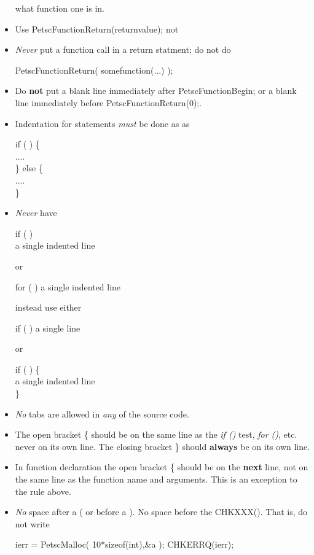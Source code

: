 \documentclass[twoside,12pt]{../sty/report_petsc}
\begin{document}
\begin{itemize}
what function one is in.
\item Use PetscFunctionReturn(returnvalue); not 
\item {\em Never} put a function call in a return statment; do not do
\begin{tabbing}
   PetscFunctionReturn( somefunction(...) );
\end{tabbing}
\item Do {\bf not} put a blank line immediately after PetscFunctionBegin; or 
a blank line immediately before PetscFunctionReturn(0);.
\item Indentation for  statements {\em must}  be done  as
as
\begin{tabbing}
   if (  ) \{\\
     ....\\
   \} else \{\\
     ....\\
   \}
\end{tabbing}
\item {\em Never}  have 
\begin{tabbing}
   if (  ) \\
     a single indented line
\end{tabbing}
or
\begin{tabbing}
   for (  )
     a single indented line
\end{tabbing}
instead use either 
\begin{tabbing}
   if (  ) a single line
\end{tabbing}
or 
\begin{tabbing}
   if (  ) \{\\
     a single indented line\\
   \}
\end{tabbing}
\item {\em No} tabs are allowed in {\em any} of the source code.
\item The open bracket \{ should be on the same line as the {\em if ()} test, {\em for ()}, etc. never on 
      its own line. The closing bracket \} should {\bf always} be on its own line. 
\item In function declaration the open bracket \{ should be on the {\bf next} line, not on the same line as the function name and
      arguments. This is an exception to the rule above.
\item {\em No} space after a ( or before a ). No space before the CHKXXX(). That is, do not write
\begin{tabbing}
   ierr = PetscMalloc( 10*sizeof(int),\&a ); CHKERRQ(ierr);

\end{tabbing}
\end{itemize}
\end{document}
